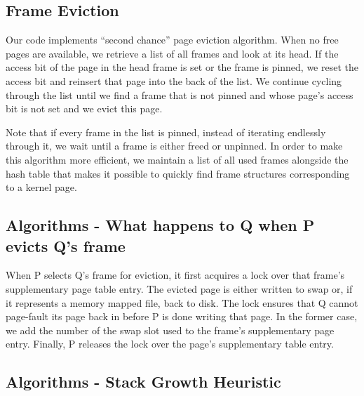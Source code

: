 
\subsection{Frame Eviction}

Our code implements ``second chance'' page eviction algorithm.
When no free pages are available, we retrieve a list of all frames and look at its head.
If the access bit of the page in the head frame is set or the frame is pinned, we reset the access bit and reinsert that page into the back of the list.
We continue cycling through the list until we find a frame that is not pinned and whose page's access bit is not set and we evict this page.

Note that if every frame in the list is pinned, instead of iterating endlessly through it, we wait until a frame is either freed or unpinned.
In order to make this algorithm more efficient, we maintain a list of all used frames alongside the hash table that makes it possible to quickly find frame structures corresponding to a kernel page.

\subsection{Algorithms - What happens to Q when P evicts Q's frame}

When P selects Q's frame for eviction, it first acquires a lock over that frame's supplementary page table entry.
The evicted page is either written to swap or, if it represents a memory mapped file, back to disk.
The lock ensures that Q cannot page-fault its page back in before P is done writing that page.
In the former case, we add the number of the swap slot used to the frame's supplementary page entry.
Finally, P releases the lock over the page's supplementary table entry.

\subsection{Algorithms - Stack Growth Heuristic}


